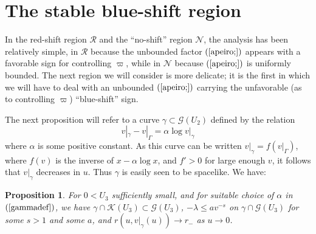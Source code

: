 \documentclass{article}
\newtheorem{proposition}[theorem]{Proposition}
\begin{document}
{\section{The stable blue-shift region}
\label{sbssec}
In the red-shift region $\mathcal{R}$ and the ``no-shift'' region
$\mathcal{N}$, the analysis has been relatively simple,
in $\mathcal{R}$ because the unbounded factor 
$(\ref{apeiro;})$
appears with a favorable sign for controlling $\varpi$, 
while in $\mathcal{N}$ because $(\ref{apeiro;})$ is
uniformly bounded. The next region we will consider is more delicate; it 
is the first in which we will have to
deal with an unbounded 
$(\ref{apeiro;})$  
carrying
the unfavorable (as to controlling $\varpi$)
``blue-shift'' sign.

The next proposition will
refer to a curve $\gamma\subset\mathcal{G}(U_2)$
defined by the relation
\begin{equation}
\label{gammadef}
v|_\gamma-v|_\Gamma=\alpha\log v|_\gamma
\end{equation}
where $\alpha$ is some positive constant.
As this curve can be written $v|_\gamma=f(v|_\Gamma)$,
where $f(v)$ is the inverse of $x-\alpha\log x$,
and $f'>0$ for large enough $v$, it 
follows that $v|_\gamma$ decreases
in $u$.
Thus $\gamma$ is easily seen to be spacelike.
We have:

\begin{proposition}
\label{sta9mpleprot}
For $0<U_3$ sufficiently small, and for suitable choice of $\alpha$
in $(\ref{gammadef})$,
we have $\gamma\cap\mathcal{K}(U_3)\subset\mathcal{G}(U_3)$, 
$-\lambda\le av^{-s}$ on 
$\gamma\cap\mathcal{G}(U_3)$
for some $s>1$ and some $a$, and $r(u,v|_\gamma(u))
\to r_-$ as $u\to0$. 
\end{proposition}

}
\end{document}
